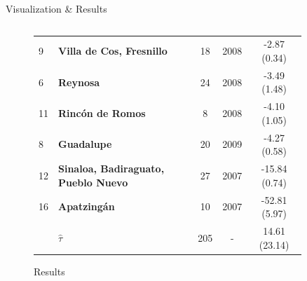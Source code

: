 \documentclass[final]{beamer}
\newlength{\sepwid}
\newlength{\onecolwid}
\newlength{\twocolwid}
\begin{document}
\begin{frame}[t]
\begin{columns}[t]
\begin{column}{\twocolwid}
\begin{block}{ Visualization \& Results}
\begin{columns}[t,totalwidth=\twocolwid]
\begin{column}{\onecolwid}
\begin{figure}[htdp]
{\begin{minipage}[ht]{0.58\linewidth}
{\begin{tabular}{llccc}
                    9&		  \textbf{Villa de Cos, Fresnillo}&  18 & 2008& -2.87  (0.34) \\				
                    6&		  \textbf{Reynosa} &  24 & 2008 &   -3.49  (1.48) \\
                    11&		\textbf{Rinc\'{o}n de Romos} & 8 & 2008& -4.10  (1.05)\\  
                    8&		  \textbf{Guadalupe} &  20 & 2009 & -4.27  (0.58) \\  
                    12&		\textbf{Sinaloa, Badiraguato, Pueblo Nuevo}&27 & 2007  & -15.84  (0.74) \\ 
                    16&		\textbf{Apatzing\'{a}n} &10 & 2007  &-52.81  (5.97) \\ 
                    \hline
                    \hline 
                    &		 \textbf{$\hat{\tau}$}& 205& - &14.61 (23.14)\\
                    \hline
                  \end{tabular}}
              \end{minipage}\hfill
            }
              \caption*{Results}
            \end{figure}
          \end{column}
        \end{columns}
      \end{block}
    \end{column}


    \begin{column}{\sepwid}\end{column}	


    \begin{column}{\onecolwid}


\end{column}
\end{columns}
\end{frame}
\end{document}

